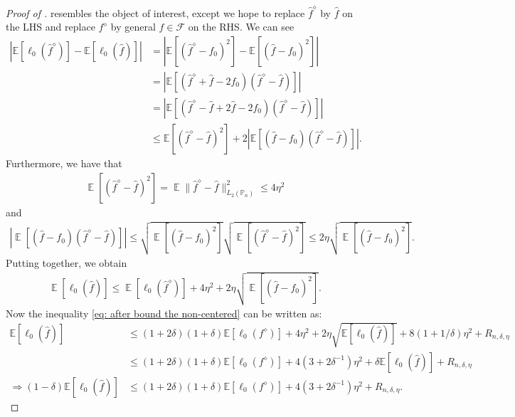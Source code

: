 \documentclass[12pt]{article}
\DeclareMathOperator*{\E}{\mathbb{E}}
\begin{document}
\begin{appendices}
\begin{proof}[Proof of ]
 resembles the object of interest, except we hope to replace $\widehat{f}^{\diamond}$ by $\widehat f$ on the LHS and replace $f^{\diamond}$ by general $f\in\mathcal{F}$ on the RHS. We can see
\begin{equation*}
\begin{aligned}
\left|\mathbb{E}[\ell_0(\widehat{f}^{\diamond})]-\mathbb{E}[\ell_0(\widehat{f})]\right| & =\left|\mathbb{E}[(\widehat{f}^{\diamond}-f_0)^2]-\mathbb{E}[(\widehat{f}-f_0)^2]\right| \\
& =\left|\mathbb{E}[(\widehat{f}^{\diamond}+\widehat{f}-2 f_0)(\widehat{f}^{\diamond}-\widehat{f})]\right| \\
& =\left|\mathbb{E}[(\widehat{f}^{\diamond}-\widehat{f}+2 \widehat{f}-2 f_0)(\widehat{f}^{\diamond}-\widehat{f})]\right| \\
& \leq \mathbb{E}[(\widehat{f}^{\diamond}-\widehat{f})^2]+2\left|\mathbb{E}[(\widehat{f}-f_0)(\widehat{f}^{\diamond}-\widehat{f})]\right| .
\end{aligned}
\end{equation*}
Furthermore, we have that 
\begin{align*}
    \E[(\widehat f^\diamond -\widehat f)^2] = \E\|\widehat f^\diamond-\widehat f\|^2_{L_2(\mathbb{P}_n)} \le 4\eta^2
\end{align*}
and 
\begin{align*}
    |\E[(\widehat f - f_0)(\widehat f^\diamond -\widehat f)]| \le \sqrt{\E[(\widehat f - f_0)^2]}\sqrt{\E[(\widehat f^\diamond -\widehat f)^2]} \le 2\eta \sqrt{\E[(\widehat f - f_0)^2]}.
\end{align*}
Putting together, we obtain 
\begin{align*}
    \E[\ell_0(\widehat f)]\leq \E[\ell_0(\widehat f^\diamond)] + 4\eta^2 + 2\eta \sqrt{\E[(\widehat f - f_0)^2]}.
\end{align*}
Now the inequality \eqref{eq: after bound the non-centered} can be written as:
\begin{equation}\label{eq: LHS is clean}
    \begin{aligned}
      \mathbb{E}[\ell_0(\widehat{f})] & \leq (1+2 \delta)(1+\delta) \mathbb{E}[\ell_0(f^{\diamond})] + 4 \eta^2+2 \eta \sqrt{\mathbb{E}[\ell_0(\widehat f)]} + 8(1+1 / \delta)  \eta^2 + R_{n, \delta, \eta}\\
    & \leq (1+2 \delta)(1+\delta) \mathbb{E}[\ell_0(f^{\diamond})]+4(3+2\delta^{-1}) \eta^2+ \delta\mathbb{E}[\ell_0(\widehat{f})]+R_{n, \delta, \eta}  \\
    \Rightarrow (1-\delta) \mathbb{E}[\ell_0(\widehat{f})]& \leq (1+2 \delta)(1+\delta) \mathbb{E}[\ell_0(f^{\diamond})]+4(3+2\delta^{-1}) \eta^2 + R_{n, \delta, \eta}.
    \end{aligned}
\end{equation}


\end{proof}
\end{appendices}
\end{document}
